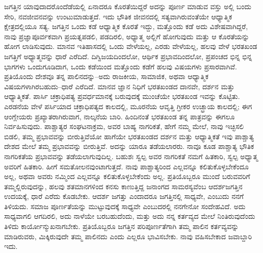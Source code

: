 ಜಗತ್ತಿನ ಯಾವುದಾದರೊಂದೆಡೆಯಲ್ಲಿ ಏನಾದರೂ ಕೊರತೆಯಿದ್ದರೆ ಅದನ್ನು ಪೂರ್ಣ ಮಾಡುವ ವಸ್ತು ಅಲ್ಲಿ ಬಂದು ಸೇರಿ, ನವಜೀವನವನ್ನು ಉಂಟುಮಾಡುತ್ತದೆ. ಇದು ಭೌತಿಕ ಜೀವನದಲ್ಲಿ ಸತ್ಯವಾಗಿರುವಂತೆಯೇ ಆಧ್ಯಾತ್ಮಿಕ ಕ್ಷೇತ್ರದಲ್ಲಿಯೂ ಸತ್ಯ. ಜಗತ್ತಿನ ಒಂದು ಕಡೆ ಆಧ್ಯಾತ್ಮಿಕ ಕೊರತೆ ಇದ್ದು, ಮತ್ತೊಂದು ಕಡೆ ಅದು ವಿಶೇಷವಾಗಿದ್ದರೆ, ನಾವು ಪ್ರಜ್ಞಾಪೂರ್ವಕವಾಗಿ ಪ್ರಯತ್ನಪಡಲಿ, ಪಡದಿರಲಿ, ಅಧ್ಯಾತ್ಮ ಅಲ್ಲಿಗೆ ಹೋಗುವುದು ಮತ್ತು ಆ ಕೊರತೆಯನ್ನು ಹೋಗ ಲಾಡಿಸುವುದು. ಮಾನವ ಇತಿಹಾಸದಲ್ಲಿ ಒಂದು ವೇಳೆಯಲ್ಲ, ಎರಡು ವೇಳೆಯಲ್ಲ, ಹಲವು ವೇಳೆ ಭರತಖಂಡ ಜಗತ್ತಿಗೆ ಅಧ್ಯಾತ್ಮವನ್ನು ಧಾರೆ ಎರೆದಿದೆ. ದಿಗ್ವಿಜಯದಿಂದಲೋ, ಆರ್ಥಿಕ ಪ್ರಭಾವದಿಂದಲೋ, ಪ್ರಪಂಚದ ಭಿನ್ನ ಭಿನ್ನ ಭಾಗಗಳು ಒಂದುಗೂಡಿದಾಗ, ಒಂದು ಕಡೆಯಿಂದ ಮತ್ತೊಂದು ಕಡೆಗೆ ಹಲವು ವಿಷಯಗಳು ಪ್ರಸಾರವಾಗಿವೆ. ಪ್ರತಿಯೊಂದು ದೇಶವೂ ತನ್ನ ಪಾಲಿನದನ್ನು–ಅದು ರಾಜಕೀಯ, ಸಾಮಾಜಿಕ, ಅಥವಾ ಆಧ್ಯಾತ್ಮಿಕ ವಿಷಯಗಳಾಗಿರಬಹುದು–ಧಾರೆ ಎರೆದಿದೆ. ಮಾನವ ಜ್ಞಾನ ನಿಧಿಗೆ ಭರತಖಂಡದ ದಾನವೇ, ದರ್ಶನ ಮತ್ತು ಆಧ್ಯಾತ್ಮಿಕತೆ. ಪಾರ್ಸಿ ಚಕ್ರಾಧಿಪತ್ಯ ಪ್ರವರ್ಧಮಾನಕ್ಕೆ ಬರುವುದಕ್ಕೆ ಮುಂಚೆಯೇ ಭರತಖಂಡ ಇವನ್ನು ಕೊಟ್ಟಿತು. ಎರಡನೆಯ ವೇಳೆ ಪರ್ಸಿಯಾದ ಚಕ್ರಾಧಿಪತ್ಯದ ಕಾಲದಲ್ಲಿ, ಮೂರನೆಯ ಆವೃತ್ತಿ ಗ್ರೀಕರ ಉಚ್ಛ್ರಾಯ ಕಾಲದಲ್ಲಿ; ಈಗ ಆಂಗ್ಲೇಯರು ಪ್ರಖ್ಯಾತರಾಗಿರುವಾಗ, ನಾಲ್ಕನೆಯ ಬಾರಿ. ಹಿಂದಿನಂತೆ ಭರತಖಂಡ ತನ್ನ ಪಾತ್ರವನ್ನು ಈಗಲೂ ನಿರ್ವಹಿಸುವುದು. ಪಾಶ್ಚಾತ್ಯರ ಸಂಘಟನಾಕ್ರಮ, ಅವರ ಬಾಹ್ಯ ನಾಗರಿಕತೆ, ಹೇಗೆ ನಮ್ಮ ಮೇಲೆ, ನಾವು ಇಚ್ಛಿಸಲಿ ಬಿಡಲಿ, ತಮ್ಮ ಪ್ರಭಾವವನ್ನು ಬೀರುತ್ತಿವೆಯೋ ಹಾಗೆಯೇ ಭರತಖಂಡದ ದರ್ಶನ ಮತ್ತು ಆಧ್ಯಾತ್ಮಿಕತೆ ಇವು ಪಾಶ್ಚಾತ್ಯ ದೇಶದ ಮೇಲೆ ತಮ್ಮ ಪ್ರಭಾವವನ್ನು ಬೀರುತ್ತಿವೆ. ಅದನ್ನು ಯಾರೂ ತಡೆಯಲಾರರು. ನಾವೂ ಕೂಡ ಪಾಶ್ಚಾತ್ಯ ಭೌತಿಕ ನಾಗರಿಕತೆಯ ಪ್ರಭಾವವನ್ನು ತಡೆಯಲಾಗುವುದಿಲ್ಲ. ಬಹುಶಃ ಸ್ವಲ್ಪ ಅವರ ನಾಗರಿಕತೆ ನಮಗೆ ಹಿತಕಾರಿ, ಸ್ವಲ್ಪ ಅಧ್ಯಾತ್ಮ ಅವರಿಗೆ ಹಿತಕಾರಿ. ಹೀಗೆ ಸಮತೋಲನವುಂಟಾಗುತ್ತದೆ. ನಾವು ಪಾಶ್ಚಾತ್ಯರಿಂದ ಎಲ್ಲವನ್ನೂ ಕಲಿತು\-ಕೊಳ್ಳಬೇಕೆಂದೂ ಅಲ್ಲ, ಅಥವಾ ಅವರು ನಮ್ಮಿಂದ ಎಲ್ಲವನ್ನೂ ಕಲಿತು\-ಕೊಳ್ಳಬೇಕೆಂದು ಅಲ್ಲ. ಪ್ರತಿಯೊಬ್ಬರೂ ಮುಂದೆ ಬರುವವರಿಗೆ ತಮ್ಮಲ್ಲಿರುವುದನ್ನು, ಹಲವು ಶತಮಾನಗಳಿಂದ ಕನಸು ಕಾಣುತ್ತಿದ್ದ ಜನಾಂಗದ ಸಾಮರಸ್ಯವೆಂಬ ಆದರ್ಶಜಗತ್ತಿನ ಉದಯಕ್ಕೆ, ಧಾರೆ ಎರೆದು ಕೊಡಬೇಕು. ಆದರ್ಶ ಜಗತ್ತು ಎಂದಾದರೂ ಜಗತ್ತಿನಲ್ಲಿ ಸಾಧ್ಯವೇ, ಎಂಬುದು ನನಗೆ ತಿಳಿಯದು. ಸಮಾಜ ಪೂರ್ಣತೆಯನ್ನು ಮುಟ್ಟುವುದಕ್ಕೆ ಸಾಧ್ಯವೇ ಎಂಬುದರಲ್ಲಿ ನನಗೇನೋ ಸಂದೇಹವಿದೆ. ಅದು ಸಾಧ್ಯವಾಗಲಿ ಆಗದಿರಲಿ, ಅದು ನಾಳೆಯೇ ಬರಬಹುದೆಂದು, ಮತ್ತು ಅದು ನನ್ನ ಕರ್ತವ್ಯದ ಮೇಲೆ ನಿಂತಿರುವುದೆಂದು ತಿಳಿದು ಕಾರ್ಯೋನ್ಮುಖನಾಗಬೇಕು. ಪ್ರತಿಯೊಬ್ಬರೂ ಜಗತ್ತಿನ ಪರಿಪೂರ್ಣತೆಗಾಗಿ ತಮ್ಮ ಪಾಲಿನ ಕರ್ತವ್ಯವನ್ನು ಮಾಡಿರುವರು, ಮಿಕ್ಕಿರುವುದೇ ತಮ್ಮ ಪಾಲಿನದು ಎಂದು ಎಲ್ಲರೂ ಭಾವಿಸಬೇಕು. ನಾವು ವಹಿಸಬೇಕಾದ ಜವಾಬ್ದಾರಿ ಇದು. 

